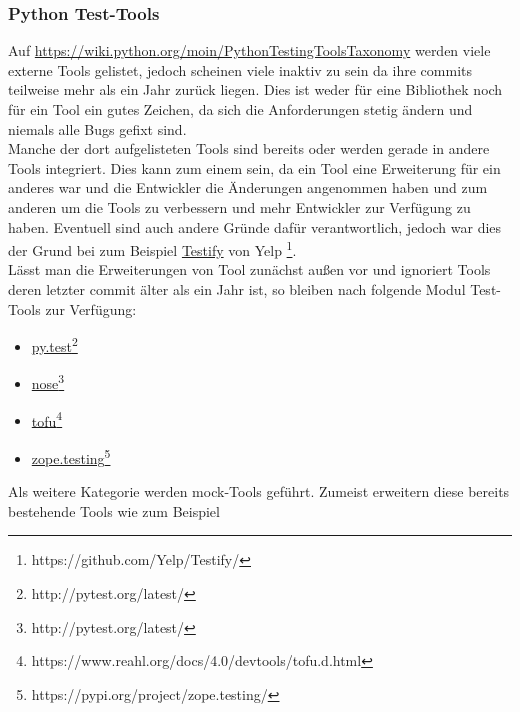 \subsubsection{Python Test-Tools}\label{python-tools:extlib:python}

Auf \url{https://wiki.python.org/moin/PythonTestingToolsTaxonomy} werden viele
externe Tools gelistet, jedoch scheinen viele inaktiv zu sein da ihre \glspl{commit}
teilweise mehr als ein Jahr zurück liegen. Dies ist weder für eine Bibliothek noch
für ein Tool ein gutes Zeichen, da sich die Anforderungen stetig ändern und niemals
alle Bugs gefixt sind.
\newline
\\
Manche der dort aufgelisteten Tools sind bereits oder werden gerade in andere Tools
integriert. Dies kann zum einem sein, da ein Tool eine Erweiterung für ein anderes
war und die Entwickler die Änderungen angenommen haben und zum anderen um die Tools
zu verbessern und mehr Entwickler zur Verfügung zu haben. Eventuell sind auch
andere Gründe dafür verantwortlich, jedoch war dies der Grund bei zum Beispiel
\href{https://github.com/Yelp/Testify/}{Testify}
von Yelp \footnote{https://github.com/Yelp/Testify/}.
\newline
\\
Lässt man die Erweiterungen von Tool zunächst außen vor und ignoriert Tools deren
letzter \gls{commit} älter als ein Jahr ist, so bleiben nach
\cite{wiki.python:PythonTestingToolsTaxonomy} folgende Modul Test-Tools zur Verfügung:
\begin{itemize}
    \item \href{http://pytest.org/latest/}{py.test}\footnote{http://pytest.org/latest/}
    \item \href{http://pytest.org/latest/}{nose}\footnote{http://pytest.org/latest/}
    \item \href{https://www.reahl.org/docs/4.0/devtools/tofu.d.html}{tofu}\footnote{https://www.reahl.org/docs/4.0/devtools/tofu.d.html}
    \item \href{https://pypi.org/project/zope.testing/}{zope.testing}\footnote{https://pypi.org/project/zope.testing/}
\end{itemize}
\noindent
Als weitere Kategorie werden \Gls{mock}-Tools geführt. Zumeist erweitern diese
bereits bestehende Tools wie zum Beispiel 
